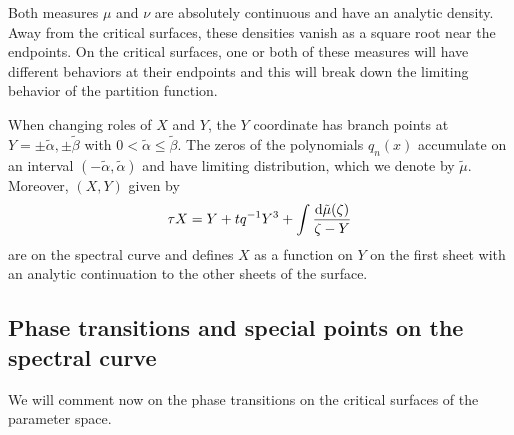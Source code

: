 \documentclass[pdftex]{sigma}
\numberwithin{equation}{section}
\begin{document}
 Both measures $\mu$ and $\nu$ are absolutely continuous and have an analytic density. Away from the critical surfaces, these densities vanish as a square root near the endpoints. On the critical surfaces, one or both of these measures will have different behaviors at their endpoints and this will break down the limiting behavior of the partition function.


 \begin{Remark}
 When changing roles of $X$ and $Y$, the $Y$ coordinate has branch points at ${Y=\pm \tilde \alpha, \pm \tilde \beta}$ with $0<\tilde \alpha\leq \tilde \beta$. The zeros of the polynomials $q_n(x)$ accumulate on an interval $(-\tilde \alpha, \tilde \alpha)$ and have limiting distribution, which we denote by $\tilde \mu$. Moreover, $(X,Y)$ given by \begin{align*}
 \tau X = Y + t q^{-1} Y^3 + \int \frac{{\rm d}\tilde{\mu}(\zeta)}{\zeta - Y}
 \end{align*}
 are on the spectral curve and defines $X$ as a function on $Y$ on the first sheet with an analytic continuation to the other sheets of the surface.
\end{Remark}

\subsection{Phase transitions and special points on the spectral curve} \label{phase-transitions-section}
We will comment now on the phase transitions on the critical surfaces of the parameter space.
\end{document}
